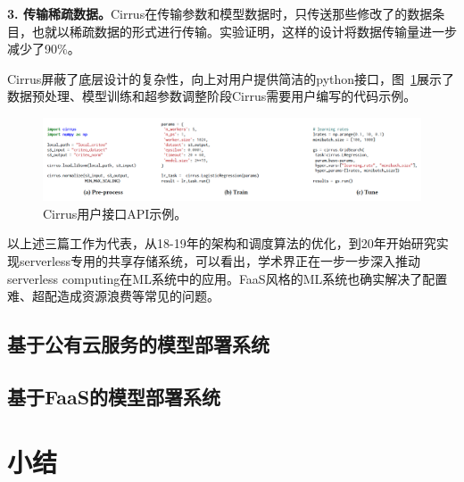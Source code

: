 \textbf{3. 传输稀疏数据。}Cirrus在传输参数和模型数据时，只传送那些修改了的数据条目，也就以稀疏数据的形式进行传输。实验证明，这样的设计将数据传输量进一步减少了90\%。

Cirrus屏蔽了底层设计的复杂性，向上对用户提供简洁的python接口，图~\ref{cirrus_api_example}展示了数据预处理、模型训练和超参数调整阶段Cirrus需要用户编写的代码示例。

\begin{figure}[h]
    \centerline{\includegraphics[width=\textwidth]{figures/cirrus-api-example.png}}
    \caption{Cirrus用户接口API示例。}
    \label{cirrus_api_example}
\end{figure}

以上述三篇工作为代表，从18-19年的架构和调度算法的优化，到20年开始研究实现serverless专用的共享存储系统，可以看出，学术界正在一步一步深入推动serverless computing在ML系统中的应用。FaaS风格的ML系统也确实解决了配置难、超配造成资源浪费等常见的问题。

\subsection{基于公有云服务的模型部署系统}

\subsection{基于FaaS的模型部署系统}

\section{小结}
